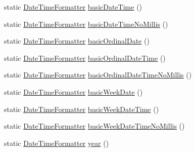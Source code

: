 \begin{DoxyCompactItemize}
\item 
static \hyperlink{classorg_1_1joda_1_1time_1_1format_1_1_date_time_formatter}{Date\-Time\-Formatter} \hyperlink{classorg_1_1joda_1_1time_1_1format_1_1_i_s_o_date_time_format_ade934c3ecd898b8f4136473c69c677e2}{basic\-Date\-Time} ()
\item 
static \hyperlink{classorg_1_1joda_1_1time_1_1format_1_1_date_time_formatter}{Date\-Time\-Formatter} \hyperlink{classorg_1_1joda_1_1time_1_1format_1_1_i_s_o_date_time_format_ad94939011a206911236403ff87ea80f5}{basic\-Date\-Time\-No\-Millis} ()
\item 
static \hyperlink{classorg_1_1joda_1_1time_1_1format_1_1_date_time_formatter}{Date\-Time\-Formatter} \hyperlink{classorg_1_1joda_1_1time_1_1format_1_1_i_s_o_date_time_format_ad9c82fcc50ea39838553864722eb5f71}{basic\-Ordinal\-Date} ()
\item 
static \hyperlink{classorg_1_1joda_1_1time_1_1format_1_1_date_time_formatter}{Date\-Time\-Formatter} \hyperlink{classorg_1_1joda_1_1time_1_1format_1_1_i_s_o_date_time_format_a555688ade9336472521bbcfe550b751a}{basic\-Ordinal\-Date\-Time} ()
\item 
static \hyperlink{classorg_1_1joda_1_1time_1_1format_1_1_date_time_formatter}{Date\-Time\-Formatter} \hyperlink{classorg_1_1joda_1_1time_1_1format_1_1_i_s_o_date_time_format_afa4192703f7c5e9880ee3e605a4a87b7}{basic\-Ordinal\-Date\-Time\-No\-Millis} ()
\item 
static \hyperlink{classorg_1_1joda_1_1time_1_1format_1_1_date_time_formatter}{Date\-Time\-Formatter} \hyperlink{classorg_1_1joda_1_1time_1_1format_1_1_i_s_o_date_time_format_ae143b8ccae8ae3ac1145c869cfa492af}{basic\-Week\-Date} ()
\item 
static \hyperlink{classorg_1_1joda_1_1time_1_1format_1_1_date_time_formatter}{Date\-Time\-Formatter} \hyperlink{classorg_1_1joda_1_1time_1_1format_1_1_i_s_o_date_time_format_a889747c1d978cb6d8c16670f255a94d2}{basic\-Week\-Date\-Time} ()
\item 
static \hyperlink{classorg_1_1joda_1_1time_1_1format_1_1_date_time_formatter}{Date\-Time\-Formatter} \hyperlink{classorg_1_1joda_1_1time_1_1format_1_1_i_s_o_date_time_format_afb03b0472608a958bdc3500243b2ee30}{basic\-Week\-Date\-Time\-No\-Millis} ()
\item 
static \hyperlink{classorg_1_1joda_1_1time_1_1format_1_1_date_time_formatter}{Date\-Time\-Formatter} \hyperlink{classorg_1_1joda_1_1time_1_1format_1_1_i_s_o_date_time_format_a09de01028c8220a2c6869c78b193e2a9}{year} ()
\item 

\end{DoxyCompactItemize}
